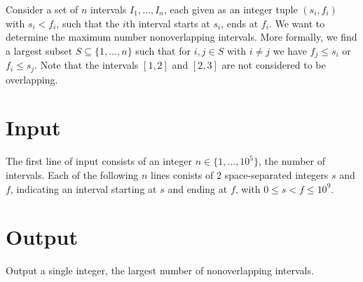 

\noindent
Consider a set of $n$ intervals $I_1,\ldots, I_n$, each given as an integer tuple $(s_i, f_i)$ with $s_i<f_i$, such that the $i$th interval starts at $s_i$, ends at $f_i$.
We want to determine the maximum number nonoverlapping intervals.
More formally, we find a largest subset $S\subseteq \{1,\ldots,n\}$ such that for $i, j\in S$ with $i\neq j$ we have $f_j \leq s_i$ or $f_i\leq s_j$. 
Note that the intervals $[1,2]$ and $[2,3]$ are not considered to be overlapping.

\section*{Input}

The first line of input consists of an integer $n\in\{1,\ldots, 10^5\}$, the number of intervals.
Each of the following $n$ lines conists of 2 space-separated integers $s$ and $f$, indicating an interval starting at $s$ and ending at $f$, with $0\leq s<f\leq 10^9$.


\section*{Output}

Output a single integer, the largest number of nonoverlapping intervals.
